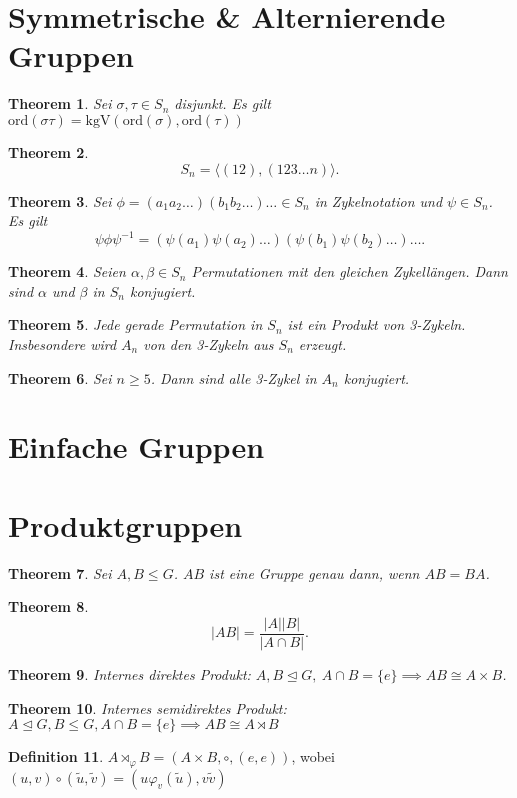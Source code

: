 \documentclass[prb,12pt]{revtex4-2}
\newtheorem{Theorem}{Theorem}
\theoremstyle{definition}
\theoremstyle{definition}
\newtheorem{Definition}[Theorem]{Definition}
\begin{document}
	\section{Symmetrische \& Alternierende Gruppen}
	\begin{Theorem}
		Sei $\sigma, \tau\in S_n$ disjunkt. Es gilt $\text{ord}(\sigma\tau)=\text{kgV}(\text{ord}(\sigma),\text{ord}(\tau))$
	\end{Theorem}
	\begin{Theorem}
		\[
		S_n=\langle (12),(123\dots n)\rangle
		.\] 
	\end{Theorem}
	\begin{Theorem}
		Sei $\phi=(a_1a_2\dots)(b_1b_2\dots)\dots\in S_n$ in Zykelnotation und $\psi\in S_n$. Es gilt
		\[
			\psi\phi\psi^{-1}=(\psi(a_1)\psi(a_2)\dots)(\psi(b_1)\psi(b_2)\dots)\dots
		.\] 
	\end{Theorem}
	\begin{Theorem}
	Seien $\alpha, \beta \in S_n$ Permutationen mit den gleichen Zykellängen. Dann sind $\alpha$ und $\beta$ in $S_n$ konjugiert.	
	\end{Theorem}
	\begin{Theorem}
	Jede gerade Permutation in $S_n$ ist ein Produkt von 3-Zykeln. Insbesondere wird $A_n$ von den 3-Zykeln aus $S_n$ erzeugt.	
	\end{Theorem}
	\begin{Theorem}
	Sei $n \ge 5$. Dann sind alle 3-Zykel in $A_n$ konjugiert.	
	\end{Theorem}
	\section{Einfache Gruppen}
	\section{Produktgruppen}
	\begin{Theorem}
		Sei  $A,B\le G$. $AB$ ist eine Gruppe genau dann, wenn $AB=BA$.

	\end{Theorem}
	\begin{Theorem}
		\[
		|AB|=\frac{|A| |B|}{|A\cap B|}
		.\] 
	\end{Theorem}
	\begin{Theorem}
		Internes direktes Produkt: $A,B\trianglelefteq G,~A\cap B=\{e\}\implies AB\cong A\times B $.
	\end{Theorem}
	\begin{Theorem}
		Internes semidirektes Produkt: $A\trianglelefteq G, B\le G,A\cap B=\{e\} \implies AB\cong A\rtimes B$
	\end{Theorem}
	\begin{Definition}
		$A\rtimes_{\varphi} B=(A\times B, \circ, (e,e))$, wobei $(u,v)\circ (\tilde{u},\tilde{v})=(u\varphi_{v}(\tilde{u}), v\tilde{v})$
	\end{Definition}
\end{document}
